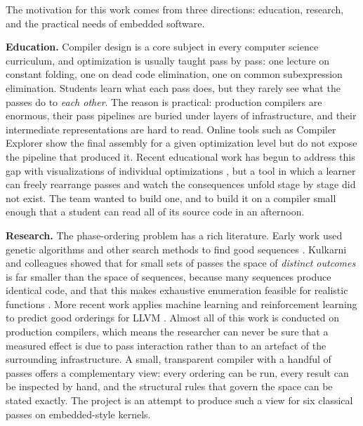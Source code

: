 The motivation for this work comes from three directions: education, research, and the practical needs of embedded software.

\textbf{Education.} Compiler design is a core subject in every computer science curriculum, and optimization is usually taught pass by pass: one lecture on constant folding, one on dead code elimination, one on common subexpression elimination. Students learn what each pass does, but they rarely see what the passes do to \emph{each other}. The reason is practical: production compilers are enormous, their pass pipelines are buried under layers of infrastructure, and their intermediate representations are hard to read. Online tools such as Compiler Explorer \cite{godbolt2019} show the final assembly for a given optimization level but do not expose the pipeline that produced it. Recent educational work has begun to address this gap with visualizations of individual optimizations \cite{koitz2025}, but a tool in which a learner can freely rearrange passes and watch the consequences unfold stage by stage did not exist. The team wanted to build one, and to build it on a compiler small enough that a student can read all of its source code in an afternoon.

\textbf{Research.} The phase-ordering problem has a rich literature. Early work used genetic algorithms and other search methods to find good sequences \cite{cooper1999,almagor2004,kulkarni2004}. Kulkarni and colleagues showed that for small sets of passes the space of \emph{distinct outcomes} is far smaller than the space of sequences, because many sequences produce identical code, and that this makes exhaustive enumeration feasible for realistic functions \cite{kulkarni2006,kulkarni2009}. More recent work applies machine learning and reinforcement learning to predict good orderings for LLVM \cite{ashouri2017,hajali2020,jain2022,cummins2023}. Almost all of this work is conducted on production compilers, which means the researcher can never be sure that a measured effect is due to pass interaction rather than to an artefact of the surrounding infrastructure. A small, transparent compiler with a handful of passes offers a complementary view: every ordering can be run, every result can be inspected by hand, and the structural rules that govern the space can be stated exactly. The project is an attempt to produce such a view for six classical passes on embedded-style kernels.

